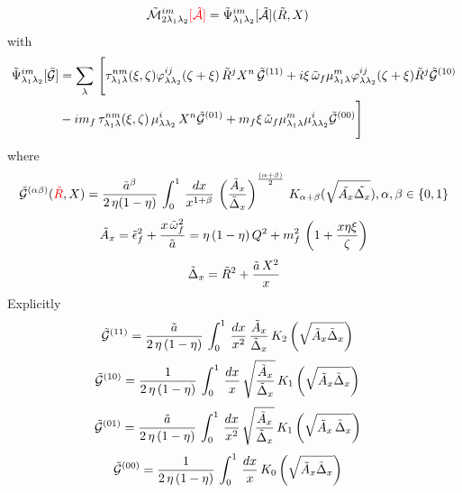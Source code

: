 \documentclass[9pt]{article}
\newif\ifmarked \markedtrue
\newcommand{\chg}[1]{\ifmarked{\color{red}#1}\else{#1}\fi}
\numberwithin{equation}{section}
\begin{document}
\begin{align}
\mathcal{\Tilde{M}}^{im}_{2\lambda_{1}\lambda_{2}}\chg{[\mathcal{\Tilde{A}}]} &  = \Tilde{\Psi}^{im}_{\lambda_{1}\lambda_{2}}[\mathcal{\Tilde{A}}] (\Tilde{R},X)
\label{chg:M2q}\end{align}
with 
\begin{align}
    \Tilde{\Psi}^{im}_{\lambda_{1}\lambda_{2}}[\mathcal{\Tilde{G}}] & = \sum_{\lambda}\, \Bigg[\tau^{nm}_{\lambda_{1}\lambda}(\xi,\zeta)\varphi^{ij}_{\lambda\lambda_{2}}(\zeta + \xi)\,\Tilde{R}^{j}X^{n}\,\mathcal{\Tilde{G}}^{(11)}+i\xi\,\Tilde{\omega}_{f}\mu^{m}_{\lambda_{1}\lambda}\varphi^{ij}_{\lambda\lambda_{2}}(\zeta + \xi)\Tilde{R}^{j}\mathcal{\Tilde{G}}^{(10)}\notag \\ & -im_{f}\,\tau^{nm}_{\lambda_{1}\lambda}(\xi,\zeta)\,\mu^{i}_{\lambda\lambda_{2}}\,X^{n}\mathcal{\Tilde{G}}^{(01)} + m_{f}\xi\,\Tilde{\omega}_{f}\mu^{m}_{\lambda_{1}\lambda}\mu^{i}_{\lambda\lambda_{2}}\mathcal{\Tilde{G}}^{(00)}\Bigg]
\end{align}
where
\label{chg:Gqarg}$$\mathcal{\Tilde{G}}^{(\alpha\beta)}(\chg{\Tilde{R}},X) = \frac{\Tilde{a}^{\beta}}{2\,\eta(1-\eta)}\,\int_{0}^{1}\, \frac{dx}{x^{1+\beta}}\, \left(\frac{\Tilde{A}_{x}}{\Tilde{\Delta}_{x}}\right)^{\frac{(\alpha + \beta)}{2}}\,K_{\alpha + \beta} (\sqrt{\Tilde{A_{x}}\Tilde{\Delta_{x}}}), \alpha, \beta \in \{0,1\}$$
$$\Tilde{A}_{x} = \Tilde{\epsilon}^{2}_{f} + \frac{x\,\Tilde{\omega}^{2}_{f}}{\Tilde{a}} = \eta\,(1-\eta)\,Q^{2} +m^{2}_{f}\,\left(1+\frac{x\eta\xi}{\zeta}\right)$$
$$\Tilde{\Delta}_{x} = \Tilde{R}^{2} + \frac{\Tilde{a}\,X^{2}}{x}$$
\label{chg:ty}\chg{Explicitly}
\begin{align}
    \mathcal{\Tilde{G}}^{(11)} & = \frac{\Tilde{a}}{2\,\eta\, (1-\eta)}\, \int_{0}^{1}\, \frac{dx}{x^{2}}\, \frac{\Tilde{A}_{x}}{\Tilde{\Delta}_{x}}\,K_{2}\left(\sqrt{\Tilde{A}_{x}\Tilde{\Delta}_{x}}\right)
\end{align}
\begin{align}
    \mathcal{\Tilde{G}}^{(10)} & = \frac{1}{2\, \eta\, (1-\eta)}\, \int_{0}^{1}\, \frac{dx}{x}\, \sqrt{\frac{\Tilde{A}_{x}}{\Tilde{\Delta}_{x}}}\, K_{1}\left(\sqrt{\Tilde{A}_{x}\Tilde{\Delta}_{x}}\right)
\end{align}
\begin{align}
     \mathcal{\Tilde{G}}^{(01)} & = \frac{\Tilde{a}}{2\, \eta\, (1-\eta)}\, \int_{0}^{1}\, \frac{dx}{x^{2}}\, \sqrt{\frac{\Tilde{A}_{x}}{\Tilde{\Delta}_{x}}}\, K_{1}\left(\sqrt{\Tilde{A}_{x}\,\Tilde{\Delta}_{x}}\right)
\end{align}
\begin{align}
     \mathcal{\Tilde{G}}^{(00)} & = \frac{1}{2\, \eta\, (1-\eta)}\, \int_{0}^{1}\, \frac{dx}{x}\, K_{0}\left(\sqrt{\Tilde{A}_{x}\Tilde{\Delta}_{x}}\right)
\end{align}
\end{document}
